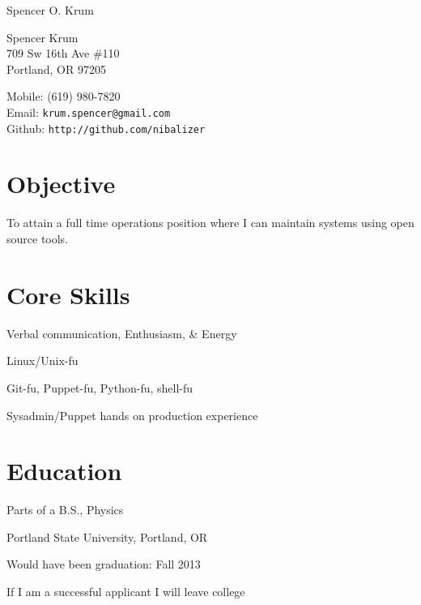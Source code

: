 \documentclass[10pt,letterpaper]{article}
\def\name{Spencer O. Krum}
\renewenvironment{itemize}{
  \begin{list}{}{
    \setlength{\leftmargin}{1.5em}
    \setlength{\itemsep}{0.25em}
    \setlength{\parskip}{0pt}
    \setlength{\parsep}{0.25em}
  }
}{
  \end{list}
}
\begin{document}
{\huge \name}


\vspace{0.25in}

\begin{minipage}[t]{0.5\textwidth}
  Spencer Krum\\
  709 Sw 16th Ave \#110\\
  Portland, OR 97205
\end{minipage}
\begin{minipage}[t]{0.5\textwidth}
  Mobile: (619) 980-7820 \\
  Email: \texttt{krum.spencer@gmail.com} \\
  Github: \texttt{http://github.com/nibalizer} \\
\end{minipage}

\section*{Objective}

To attain a full time operations position where I can maintain systems using open source tools.
\\

\begin{minipage}[t]{0.5\textwidth}
\section*{Core Skills}
\begin{itemize}
\item Verbal communication, Enthusiasm, \& Energy
\item Linux/Unix-fu
\item Git-fu, Puppet-fu, Python-fu, shell-fu
\item Sysadmin/Puppet hands on production experience
\end{itemize}
\end{minipage}
\begin{minipage}[t]{0.5\textwidth}
\section*{Education}
\begin{itemize}

  \item Parts of a B.S., Physics
  \item Portland State University, Portland, OR
  \item Would have been graduation: Fall 2013
  \item If I am a successful applicant I will leave college

\end{itemize}
\end{minipage}
\end{document}

